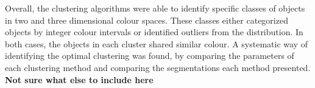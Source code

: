 Overall, the clustering algorithms were able to identify specific classes of objects in two and three dimensional colour spaces.
These classes either categorized objects by integer colour intervals or identified outliers from the distribution. 
In both cases, the objects in each cluster shared similar colour.
A systematic way of identifying the optimal clustering was found, by comparing the parameters of each clustering method and comparing the segmentations each method presented.
\textbf{Not sure what else to include here}